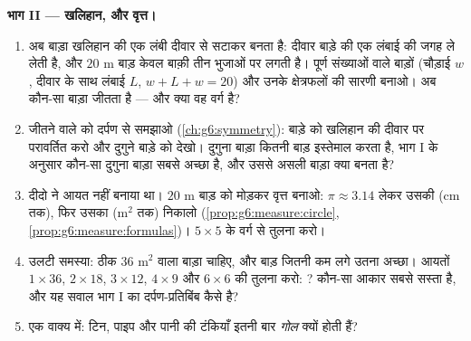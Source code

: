 \begin{problem}
\medskip
\noindent\textbf{भाग II --- खलिहान, और वृत्त।}
\begin{enumerate}[resume]
  \item अब बाड़ा खलिहान की एक लंबी दीवार से सटाकर बनता है: दीवार
        बाड़े की एक लंबाई की जगह ले लेती है, और $20$ m बाड़ केवल
        बाक़ी तीन भुजाओं पर लगती है। पूर्ण संख्याओं वाले बाड़ों
        (चौड़ाई $w$, दीवार के साथ लंबाई $L$, $w + L + w = 20$)
        और उनके क्षेत्रफलों की सारणी बनाओ। अब कौन-सा बाड़ा जीतता
        है --- और क्या वह वर्ग है?
  \item जीतने वाले को दर्पण से समझाओ
        (\cref{ch:g6:symmetry}): बाड़े को खलिहान की दीवार पर
        परावर्तित करो और दुगुने बाड़े को देखो। दुगुना बाड़ा कितनी
        बाड़ इस्तेमाल करता है, भाग I के अनुसार कौन-सा दुगुना
        बाड़ा सबसे अच्छा है, और उससे असली बाड़ा क्या बनता है?
  \item दीदो ने आयत नहीं बनाया था। $20$ m बाड़ को मोड़कर वृत्त
        बनाओ: $\pi \approx 3.14$ लेकर उसकी  (cm तक),
        फिर उसका  (m$^2$ तक) निकालो
        (\cref{prop:g6:measure:circle},
        \cref{prop:g6:measure:formulas})। $5 \times 5$ के वर्ग
        से तुलना करो।
  \item उलटी समस्या: ठीक $36$ m$^2$  वाला बाड़ा चाहिए,
        और बाड़ जितनी कम लगे उतना अच्छा। आयतों $1 \times 36$,
        $2 \times 18$, $3 \times 12$,
        $4 \times 9$ और $6 \times 6$ की तुलना करो: ? कौन-सा
        आकार सबसे सस्ता है, और यह सवाल भाग I का दर्पण-प्रतिबिंब
        कैसे है?
  \item एक वाक्य में: टिन, पाइप और पानी की टंकियाँ इतनी बार
        \emph{गोल} क्यों होती हैं?
\end{enumerate}


\end{problem}

